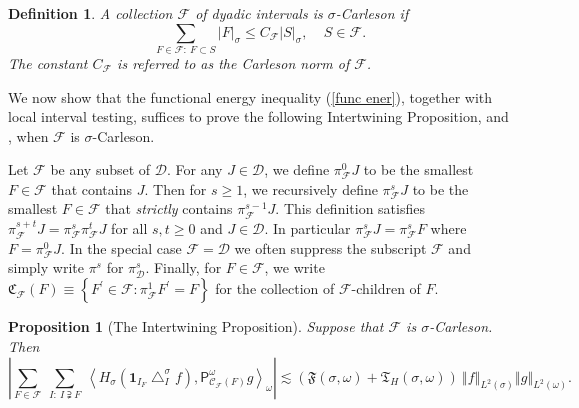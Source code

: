 \documentclass{amsart}%
\theoremstyle{plain}
\newtheorem{definition}[theorem]{Definition}
\newtheorem{proposition}[theorem]{Proposition}
\numberwithin{equation}{section}
\begin{document}
\begin{definition}
\label{sigma carleson n}A collection $\mathcal{F}$ of dyadic intervals is
$\sigma$\emph{-Carleson} if%
\[
\sum_{F\in\mathcal{F}:\ F\subset S}\left\vert F\right\vert _{\sigma}\leq
C_{\mathcal{F}}\left\vert S\right\vert _{\sigma},\ \ \ \ \ S\in\mathcal{F}.
\]
The constant $C_{\mathcal{F}}$ is referred to as the Carleson norm of
$\mathcal{F}$.
\end{definition}

We now show that the functional energy inequality (\ref{func ener}), together
with local interval testing, suffices to prove the following Intertwining
Proposition, \cite{SaShUr7} and \cite{SaShUr12}, when $\mathcal{F}$ is
$\sigma$-Carleson.

Let $\mathcal{F}$ be any subset of $\mathcal{D}$. For any $J\in\mathcal{D}$,
we define $\pi_{\mathcal{F}}^{0}J$ to be the smallest $F\in\mathcal{F}$ that
contains $J$. Then for $s\geq1$, we recursively define $\pi_{\mathcal{F}}%
^{s}J$ to be the smallest $F\in\mathcal{F}$ that \emph{strictly} contains
$\pi_{\mathcal{F}}^{s-1}J$. This definition satisfies $\pi_{\mathcal{F}}%
^{s+t}J=\pi_{\mathcal{F}}^{s}\pi_{\mathcal{F}}^{t}J$ for all $s,t\geq0$ and
$J\in\mathcal{D}$. In particular $\pi_{\mathcal{F}}^{s}J=\pi_{\mathcal{F}}%
^{s}F$ where $F=\pi_{\mathcal{F}}^{0}J$. In the special case $\mathcal{F}%
=\mathcal{D}$ we often suppress the subscript $\mathcal{F}$ and simply write
$\pi^{s}$ for $\pi_{\mathcal{D}}^{s}$. Finally, for $F\in\mathcal{F}$, we
write $\mathfrak{C}_{\mathcal{F}}\left(  F\right)  \equiv\left\{  F^{\prime
}\in\mathcal{F}:\pi_{\mathcal{F}}^{1}F^{\prime}=F\right\}  $ for the
collection of $\mathcal{F}$-children of $F$.

\begin{proposition}
[The Intertwining Proposition]\label{strongly adapted'}Suppose that
$\mathcal{F}$ is $\sigma$-Carleson. Then%
\[
\left\vert \sum_{F\in\mathcal{F}}\ \sum_{I:\ I\supsetneqq F}\ \left\langle
H_{\sigma}\left(  \mathbf{1}_{I_{F}}\bigtriangleup_{I}^{\sigma}f\right)
,\mathsf{P}_{\mathcal{C}_{\mathcal{F}}\left(  F\right)  }^{\omega
}g\right\rangle _{\omega}\right\vert \lesssim\left(  \mathfrak{F}\left(
\sigma,\omega\right)  +\mathfrak{T}_{H}\left(  \sigma,\omega\right)  \right)
\ \left\Vert f\right\Vert _{L^{2}\left(  \sigma\right)  }\left\Vert
g\right\Vert _{L^{2}\left(  \omega\right)  }.
\]

\end{proposition}
\end{document}
